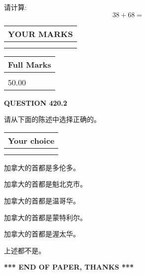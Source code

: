 \documentclass{ctexart}
\begin{document}
  
 
请计算:
\begin{equation}
38 +  %
68 = \nonumber
\end{equation}
 

 

 
  
\vspace{0.2in}
  
\noindent\begin{tabular}{|l|}
\hline
 YOUR MARKS  \\
\hline
 \\ 
 \\ 
\hline
\end{tabular}
\hspace{0.05in} \begin{tabular}{|l|}
\hline
 Full Marks  \\
\hline
 \\ 
50.00 \\
\hline
\end{tabular}
{\textbf{\Large{QUESTION
420.2 
}}}
  
  
请从下面的陈述中选择正确的。
  
  
\noindent\hspace{3.0in} \begin{tabular}{|l|}
\hline
Your choice \\
\hline
 \\ 
 \\ 
\hline
\end{tabular}
  
  
 
 
加拿大的首都是多伦多。
 
 
加拿大的首都是魁北克市。
 
 
加拿大的首都是温哥华。
 
 
加拿大的首都是蒙特利尔。
 
 
加拿大的首都是渥太华。
 
 
 上述都不是。
 
 
   
   
 \vspace{0.2in}
 
   
   
   
   
\vspace{1.0in} 
{\textbf{\large{ *** END OF PAPER, THANKS *** }}} 
   
\end{document}

